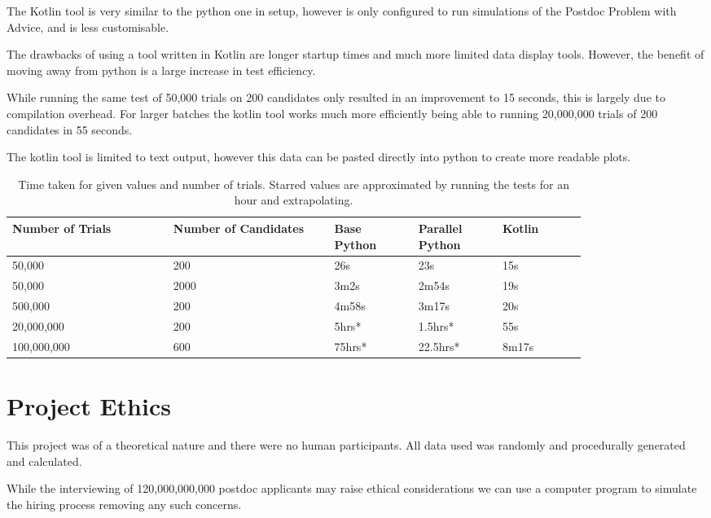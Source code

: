\documentclass[a4paper,11pt]{article}
\begin{document}
The Kotlin tool is very similar to the python one in setup, however is only configured to run simulations of the Postdoc Problem with Advice, and is less customisable.

The drawbacks of using a tool written in Kotlin are longer startup times and much more limited data display tools. However, the benefit of moving away from python is a large increase in test efficiency.

While running the same test of 50,000 trials on 200 candidates only resulted in an improvement to 15 seconds, this is largely due to compilation overhead. For larger batches the kotlin tool works much more efficiently being able to running 20,000,000 trials of 200 candidates in 55 seconds.

The kotlin tool is limited to text output, however this data can be pasted directly into python to create more readable plots.
\begin{table}[H]
\begin{tabular}{|p{0.23\linewidth}|p{0.23\linewidth}|p{0.12\linewidth}|p{0.12\linewidth}|p{0.12\linewidth}|}

\hline
Number of Trials & Number of Candidates & Base Python & Parallel Python & Kotlin\\
\hline
50,000 &200& 26s & 23s & 15s\\
\hline
50,000 & 2000 & 3m2s & 2m54s & 19s\\
\hline
500,000 &200& 4m58s & 3m17s & 20s\\
\hline
20,000,000& 200 & 5hrs* & 1.5hrs* & 55s\\
\hline
100,000,000& 600 & 75hrs* & 22.5hrs* & 8m17s\\
\hline
\end{tabular}
\label{table:1}
\caption{Time taken for given values and number of trials. Starred values are approximated by running the tests for an hour and extrapolating.}
\end{table}

\section{Project Ethics}

This project was of a theoretical nature and there were no human participants. All data used was randomly and procedurally generated and calculated. 

While the interviewing of 120,000,000,000 postdoc applicants may raise ethical considerations we can use a computer program to simulate the hiring process removing any such concerns.
\end{document}
